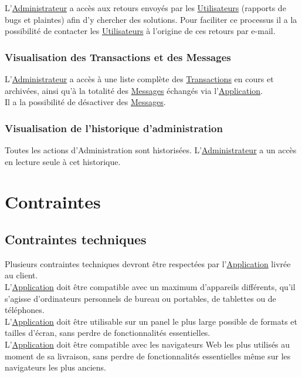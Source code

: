 \documentclass[french,12pt]{article}
\begin{document}
				L’\hyperlink{administrateur}{Administrateur} a accès aux retours envoyés
				 par les \hyperlink{utilisateur}{Utilisateurs} (rapports de bugs et
				 plaintes) afin d’y chercher des solutions. Pour faciliter ce processus
				 il a la possibilité de contacter les
				 \hyperlink{utilisateur}{Utilisateurs} à l’origine de ces retours par
				 e-mail.

			\subsubsection{Visualisation des Transactions et des Messages}

				L’\hyperlink{administrateur}{Administrateur} a accès à une liste
				 complète des \hyperlink{transaction}{Transactions} en cours et
				 archivées, ainsi qu’à la totalité des \hyperlink{message}{Messages}
				 échangés via l’\hyperlink{application}{Application}.\\
				Il a la possibilité de désactiver des \hyperlink{message}{Messages}.

			\subsubsection{Visualisation de l’historique d’administration}

				Toutes les actions d’Administration sont historisées.
				 L’\hyperlink{administrateur}{Administrateur} a un accès en lecture
				 seule à cet historique.

	\newpage
	\section{Contraintes}

		\subsection{Contraintes techniques}

			Plusieurs contraintes techniques devront être respectées par
			 l’\hyperlink{application}{Application} livrée au client.\\
			L’\hyperlink{application}{Application} doit être compatible avec un
			 maximum d’appareils différents, qu’il s’agisse d’ordinateurs personnels
			 de bureau ou portables, de tablettes ou de téléphones.\\
			L’\hyperlink{application}{Application} doit être utilisable sur un panel
			 le plus large possible de formats et tailles d’écran, sans perdre de
			 fonctionnalités essentielles.\\
			L’\hyperlink{application}{Application} doit être compatible avec les
			 navigateurs Web les plus utilisés au moment de sa livraison, sans perdre
			 de fonctionnalités essentielles même sur les navigateurs les plus
			 anciens.
\end{document}
